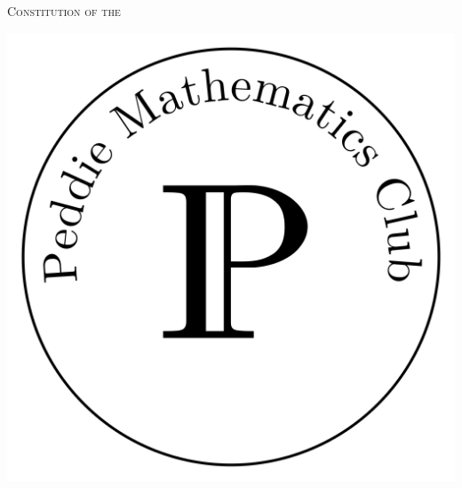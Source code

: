 \documentclass[12pt, letterpaper]{article}
\begin{document}
\fontsize{12pt}{12pt}\selectfont
\setlength{\abovedisplayskip}{0pt}

\begin{center}
	\vspace*{\fill}

	\vspace{-80pt}
	\huge
	\textsc{Constitution of the}

	\vspace{2pt}
	\huge

	\vspace{40pt}
	\includegraphics[scale=3]{logo.png}

	\vspace*{\fill}
\end{center}
\newpage
\end{document}
